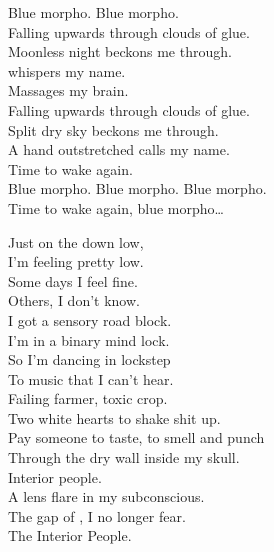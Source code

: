 Blue morpho. Blue morpho. \\

Falling upwards through clouds of glue. \\
Moonless night beckons me through. \\
 whispers my name. \\
Massages my brain. \\

Falling upwards through clouds of glue. \\
Split dry sky beckons me through. \\
A hand outstretched calls my name. \\
Time to wake again. \\

Blue morpho. Blue morpho. Blue morpho. \\

Time to wake again, blue morpho… \\





Just on the down low, \\
I'm feeling pretty low. \\
Some days I feel fine. \\
Others, I don't know. \\
I got a sensory road block. \\
I'm in a binary mind lock. \\
So I'm dancing in lockstep \\
To music that I can't hear. \\

Failing farmer, toxic crop. \\
Two white hearts to shake shit up. \\
Pay someone to taste, to smell and punch \\
Through the dry wall inside my skull. \\

Interior people. \\
A lens flare in my subconscious. \\
The gap of , I no longer fear. \\
The Interior People. \\

